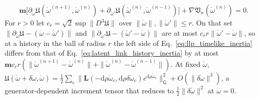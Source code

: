 \begin{proposition}
\begin{equation}
\mathbf m\bigl[\partial_{\mathring\omega}\mathfrak U(\mathring\omega^{(n+1)},\mathring\omega^{(n)})+\partial_{\mathring\omega'}\mathfrak U(\mathring\omega^{(n)},\mathring\omega^{(n-1)})\bigr]+\nabla\mathfrak V_n(\mathring\omega^{(n)})=0.
\label{eq:llp_timelike_inertia}
\end{equation}
For $r>0$ let $c_r=\sqrt2\sup\|D^3\mathfrak U\|$ over $\|\mathring\omega\|,\|\mathring\omega'\|\leq r$. On that set $\|\partial_{\mathring\omega}\mathfrak U-(\mathring\omega-\mathring\omega')\|$ and $\|\partial_{\mathring\omega'}\mathfrak U-(\mathring\omega'-\mathring\omega)\|$ are at most $c_rr\|\mathring\omega'-\mathring\omega\|$, so at a history in the ball of radius $r$ the left side of Eq.~\eqref{eq:llp_timelike_inertia} differs from that of Eq.~\eqref{eq:latent_link_history_inertia} by at most $\mathbf mc_rr(\|\mathring\omega^{(n+1)}-\mathring\omega^{(n)}\|+\|\mathring\omega^{(n)}-\mathring\omega^{(n-1)}\|)$. At fixed $\mathring\omega$, $\mathfrak U(\mathring\omega+\delta\mathring\omega,\mathring\omega)=\frac12\sum_e\|\mathbf L(-\mathrm d\rho\mathring\omega_e,\mathrm d\rho\delta\mathring\omega_e)e^{\mathrm d\rho\mathring\omega_e}\|_{\mathsf G}^2+O(\|\delta\mathring\omega\|^3)$, a generator-dependent increment tensor that reduces to $\frac12\|\delta\mathring\omega\|^2$ at $\mathring\omega=0$.
\end{proposition}

